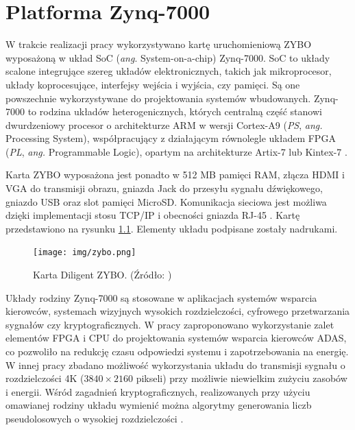 \chapter{Platforma Zynq-7000}
\label{cha:platform}

W trakcie realizacji pracy wykorzystywano kartę uruchomieniową ZYBO wyposażoną w układ SoC (\emph{ang}. System-on-a-chip) Zynq-7000. 
SoC to układy scalone integrujące szereg układów elektronicznych, takich jak mikroprocesor, układy koprocesujące, interfejsy wejścia i wyjścia, czy pamięci. 
Są one powszechnie wykorzystywane do projektowania systemów wbudowanych. 
Zynq-7000 to rodzina układów heterogenicznych, których centralną część stanowi dwurdzeniowy procesor o architekturze ARM w wersji Cortex-A9 (\emph{PS}, \emph{ang.} Processing System), współpracujący z działającym równolegle układem FPGA (\emph{PL}, \emph{ang.} Programmable Logic), opartym na architekturze Artix-7 lub Kintex-7 \cite{zynq-homepage}.

Karta ZYBO wyposażona jest ponadto w 512 MB pamięci RAM, złącza HDMI i VGA do transmisji obrazu, gniazda Jack do przesyłu sygnału dźwiękowego, gniazdo USB oraz slot pamięci MicroSD.
Komunikacja sieciowa jest możliwa dzięki implementacji stosu TCP/IP i obecności gniazda RJ-45 \cite{zynq-datasheet}. Kartę przedstawiono na rysunku \ref{fig:zybo-img}. Elementy układu podpisane zostały nadrukami.

\begin{figure}[H]
	\centering
	\texttt{[image: img/zybo.png]}
	\caption{Karta Diligent ZYBO. (Źródło: \cite{zybo-reference-manual})}
	\label{fig:zybo-img}
\end{figure}

Układy rodziny Zynq-7000 są stosowane w aplikacjach systemów wsparcia kierowców, systemach wizyjnych wysokich rozdzielczości, cyfrowego przetwarzania sygnałów czy kryptograficznych. 
W pracy \cite{GuanwenZhong} zaproponowano wykorzystanie zalet elementów FPGA i CPU do projektowania systemów wsparcia kierowców ADAS, co pozwoliło na redukcję czasu odpowiedzi systemu i zapotrzebowania na energię.
W innej pracy \cite{MaleenAbeydeera} zbadano możliwość wykorzystania układu do transmisji sygnału o rozdzielczości 4K ($3840 \times 2160$ pikseli) przy możliwie niewielkim zużyciu zasobów i energii.
Wśród zagadnień kryptograficznych, realizowanych przy użyciu omawianej rodziny układu wymienić można algorytmy generowania liczb pseudolosowych o wysokiej rozdzielczości	\cite{PawelDabal2014}.

